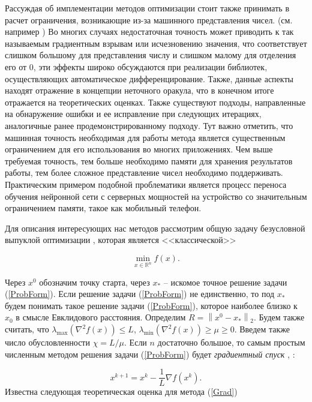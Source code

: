   Рассуждая об имплементации методов оптимизации стоит также принимать в расчет ограничения, возникающие из-за машинного представления чисел. (см. например \cite{low_prec_grad, low_prec_train}) Во многих случаях недостаточная точность может приводить к так называемым градиентным взрывам или исчезновению значения, что соответствует слишком большому для представления числу и слишком малому для отделения его от 0, эти эффекты широко обсуждаются при реализации библиотек, осуществляющих автоматическое дифференцирование. Также, данные аспекты находят отражение в концепции неточного оракула, что в конечном итоге отражается на теоретических оценках. Также существуют подходы, направленные на обнаружение ошибки и ее исправление при следующих итерациях, аналогичные ранее продемонстрированному подходу. Тут важно отметить, что машинная точность необходимая для работы метода является существенным ограничением для его использования во многих приложениях. Чем выше требуемая точность, тем больше необходимо памяти для хранения результатов работы, тем более сложное представление чисел необходимо поддерживать. Практическим примером подобной проблематики является процесс переноса обучения нейронной сети с серверных мощностей на устройство со значительным ограничением памяти, такое как мобильный телефон. \cite{progeressive_low_precision, high_acc_low}


  Для описания интересующих нас методов рассмотрим общую задачу безусловной выпуклой оптимизации \cite{gasnikov2017universal}, которая является <<классической>>

  \begin{equation}
  \label{ProbForm}
  \min_{x\in \mathbb{R}^n} {f\left( x \right)}.
  \end{equation}

  Через $x^0$ обозначим точку старта, через $x_\ast$ -- искомое точное решение задачи (\ref{ProbForm}). Если решение задачи (\ref{ProbForm}) не единственно, то под $x_*$ будем понимать такое решение задачи (\ref{ProbForm}), которое наиболее близко к $x_0$ в смысле Евклидового расстояния. Определим $R = \left\| {x^0-x_\ast } \right\|_2 $. Будем также считать, что $\lambda_{\max} \left( \nabla^2 f\left( x \right) \right) \le L$, $\lambda_{\min} \left( \nabla^2 f\left( x \right) \right) \ge \mu \ge 0$. Введем также число обусловленности $\chi = L/\mu$. Если $n$ достаточно большое, то самым простым численным методом решения задачи (\ref{ProbForm}) будет \textit{градиентный спуск} \cite{nesterov2013introductory}, \cite{Polyak1983}:

  \begin{equation} \label{Grad}
  x^{k+1} = x^k - \frac{1}{L}\nabla f\left( x^k \right).
  \end{equation}
  Известна следующая теоретическая оценка для метода (\ref{Grad})

